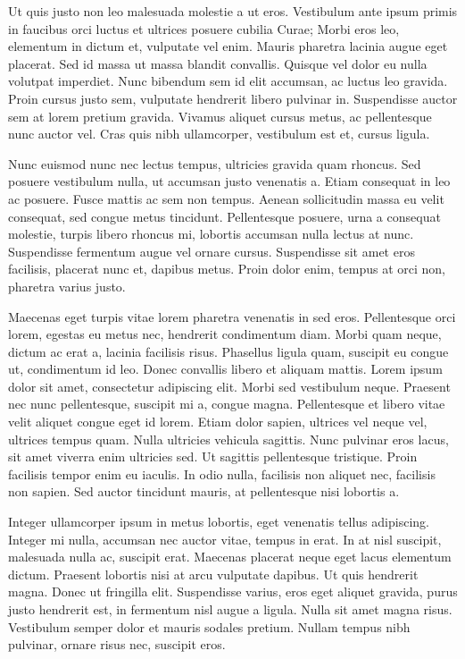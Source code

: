 \documentclass[manuscript]{geophysics}
\begin{document}
Ut quis justo non leo malesuada molestie a ut eros. Vestibulum ante ipsum
primis in faucibus orci luctus et ultrices posuere cubilia Curae; Morbi eros
leo, elementum in dictum et, vulputate vel enim. Mauris pharetra lacinia augue
eget placerat. Sed id massa ut massa blandit convallis. Quisque vel dolor eu
nulla volutpat imperdiet. Nunc bibendum sem id elit accumsan, ac luctus leo
gravida. Proin cursus justo sem, vulputate hendrerit libero pulvinar in.
Suspendisse auctor sem at lorem pretium gravida. Vivamus aliquet cursus metus,
ac pellentesque nunc auctor vel. Cras quis nibh ullamcorper, vestibulum est et,
cursus ligula.

Nunc euismod nunc nec lectus tempus, ultricies gravida quam rhoncus. Sed
posuere vestibulum nulla, ut accumsan justo venenatis a. Etiam consequat in leo
ac posuere. Fusce mattis ac sem non tempus. Aenean sollicitudin massa eu velit
consequat, sed congue metus tincidunt. Pellentesque posuere, urna a consequat
molestie, turpis libero rhoncus mi, lobortis accumsan nulla lectus at nunc.
Suspendisse fermentum augue vel ornare cursus. Suspendisse sit amet eros
facilisis, placerat nunc et, dapibus metus. Proin dolor enim, tempus at orci
non, pharetra varius justo.

Maecenas eget turpis vitae lorem pharetra venenatis in sed eros. Pellentesque
orci lorem, egestas eu metus nec, hendrerit condimentum diam. Morbi quam neque,
dictum ac erat a, lacinia facilisis risus. Phasellus ligula quam, suscipit eu
congue ut, condimentum id leo. Donec convallis libero et aliquam mattis. Lorem
ipsum dolor sit amet, consectetur adipiscing elit. Morbi sed vestibulum neque.
Praesent nec nunc pellentesque, suscipit mi a, congue magna. Pellentesque et
libero vitae velit aliquet congue eget id lorem. Etiam dolor sapien, ultrices
vel neque vel, ultrices tempus quam. Nulla ultricies vehicula sagittis. Nunc
pulvinar eros lacus, sit amet viverra enim ultricies sed. Ut sagittis
pellentesque tristique. Proin facilisis tempor enim eu iaculis. In odio nulla,
facilisis non aliquet nec, facilisis non sapien. Sed auctor tincidunt mauris,
at pellentesque nisi lobortis a.

Integer ullamcorper ipsum in metus lobortis, eget venenatis tellus adipiscing.
Integer mi nulla, accumsan nec auctor vitae, tempus in erat. In at nisl
suscipit, malesuada nulla ac, suscipit erat. Maecenas placerat neque eget lacus
elementum dictum. Praesent lobortis nisi at arcu vulputate dapibus. Ut quis
hendrerit magna. Donec ut fringilla elit. Suspendisse varius, eros eget aliquet
gravida, purus justo hendrerit est, in fermentum nisl augue a ligula. Nulla sit
amet magna risus. Vestibulum semper dolor et mauris sodales pretium. Nullam
tempus nibh pulvinar, ornare risus nec, suscipit eros.
\end{document}
